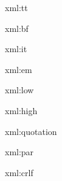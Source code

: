 
\startxmlsetups xml:tt
	{\tt {}}
\stopxmlsetups

\startxmlsetups xml:bf
	{\bf {}}
\stopxmlsetups

\startxmlsetups xml:it
	{\it {}}
\stopxmlsetups

\startxmlsetups xml:em
	{\em {}}
\stopxmlsetups

\startxmlsetups xml:low
\stopxmlsetups

\startxmlsetups xml:high
\stopxmlsetups

\startxmlsetups xml:quotation
\stopxmlsetups

\startxmlsetups xml:par
	\par
\stopxmlsetups

\startxmlsetups xml:crlf
	\crlf
\stopxmlsetups

